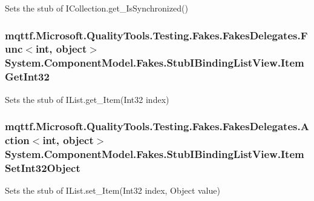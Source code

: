 Sets the stub of I\-Collection.\-get\-\_\-\-Is\-Synchronized()

\hypertarget{class_system_1_1_component_model_1_1_fakes_1_1_stub_i_binding_list_view_a9f6fb43dbb50015ec3120cf50adb8744}{
\subsubsection[{Item\-Get\-Int32}]{\setlength{\rightskip}{0pt plus 5cm}mqttf.\-Microsoft.\-Quality\-Tools.\-Testing.\-Fakes.\-Fakes\-Delegates.\-Func$<$int, object$>$ System.\-Component\-Model.\-Fakes.\-Stub\-I\-Binding\-List\-View.\-Item\-Get\-Int32}}\label{class_system_1_1_component_model_1_1_fakes_1_1_stub_i_binding_list_view_a9f6fb43dbb50015ec3120cf50adb8744}


Sets the stub of I\-List.\-get\-\_\-\-Item(\-Int32 index)

\hypertarget{class_system_1_1_component_model_1_1_fakes_1_1_stub_i_binding_list_view_ae14d1ba95198c867c2c162ff39a4da24}{
\subsubsection[{Item\-Set\-Int32\-Object}]{\setlength{\rightskip}{0pt plus 5cm}mqttf.\-Microsoft.\-Quality\-Tools.\-Testing.\-Fakes.\-Fakes\-Delegates.\-Action$<$int, object$>$ System.\-Component\-Model.\-Fakes.\-Stub\-I\-Binding\-List\-View.\-Item\-Set\-Int32\-Object}}\label{class_system_1_1_component_model_1_1_fakes_1_1_stub_i_binding_list_view_ae14d1ba95198c867c2c162ff39a4da24}


Sets the stub of I\-List.\-set\-\_\-\-Item(\-Int32 index, Object value)

